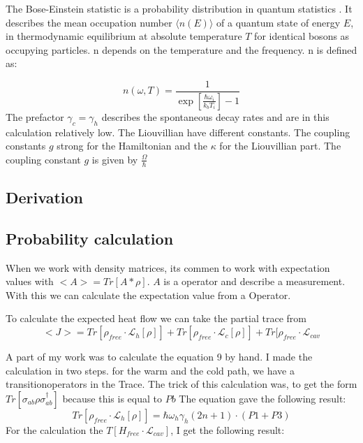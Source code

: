 \documentclass[12pt,a4paper]{article}
\begin{document}
The Bose-Einstein statistic is a probability distribution in quantum statistics . It describes the mean occupation number $\langle n(E) \rangle$ of a quantum state of energy $E$, in thermodynamic equilibrium at absolute temperature $T $ for identical bosons as occupying particles. n depends on the temperature and the frequency.
n is defined as:

\begin{equation}
n(\omega,T)=\frac{1}{\exp[\frac{\hbar \omega_i}{k_b T_i}]-1}
\end{equation}
The  prefactor $\gamma_c=\gamma_h$ describes the spontaneous decay rates and are in this calculation relatively low.
The Liouvillian have different constants. The coupling constants $g$ strong for the Hamiltonian and the $\kappa$ for the Liouvillian part. 
The coupling constant $g$ is given by $\frac{\Omega}{\hbar}$

\subsection{Derivation}


\subsection{Probability calculation}
 When we work with density matrices, its commen to work with expectation values with $<A>=Tr[A*\rho]$.
 $A$ is a operator and describe a measurement.
With this we can calculate the expectation value from a Operator. 

To calculate the expected heat flow we can take the partial trace from 
\begin{equation}
<J>=Tr[\rho_{free}\cdot \mathcal{L}_h[\rho]]+Tr[\rho_{free}\cdot \mathcal{L}_c[\rho]]+Tr[\rho_{free}\cdot \mathcal{L}_{cav}
\end{equation}

A part of my work was to calculate the equation 9 by hand. 
I made the calculation in two steps. for the warm and the cold path, we have a transitionoperators in the Trace.
The trick of this calculation was, to get the form $Tr[\sigma_{ab}\rho \sigma_{ab}^{\dag{}}]$ because this is equal to $Pb$
The equation gave the following result:
\begin{equation}
Tr[\rho_{free}\cdot \mathcal{L}_h[\rho]]=\hbar \omega_h \gamma_h (2n+1) \cdot( P1+P3) 
\end{equation}
For the calculation the $T[H_{free}\cdot \mathcal{L}_{cav}]$, I get the following result:
\end{document}

